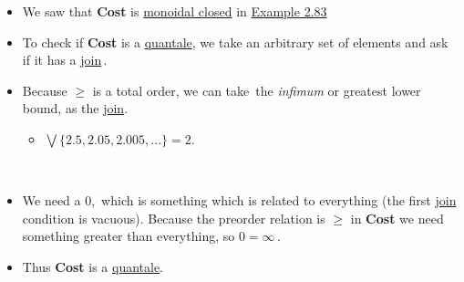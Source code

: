 \begin{itemize}
    \item  We saw that \textbf{Cost} is \href{doc/1 math/Seven Sketches in Compositionality/Chapter 2: Resource theories/5 Computing presented V-categories with matrix mult/1 Monoidal closed preorders/1 Closed SMP}{monoidal closed} in \href{doc/1 math/Seven Sketches in Compositionality/Chapter 2: Resource theories/5 Computing presented V-categories with matrix mult/1 Monoidal closed preorders/3 Cost is closed}{Example 2.83}
    \item To check if \textbf{Cost} is a \href{doc/1 math/Seven Sketches in Compositionality/Chapter 2: Resource theories/5 Computing presented V-categories with matrix mult/2 Quantales/1 Quantale}{quantale}, we take an arbitrary set of elements and ask \,if it has a \href{doc/1 math/Seven Sketches in Compositionality/Chapter 1: Generative Effects/5 Meets and joins/1 Definition and basic examples/Meet and join}{join}\,.
    \item Because $\geq$ is a total order, we can take \,the \emph{infimum} or greatest lower bound, as the \href{doc/1 math/Seven Sketches in Compositionality/Chapter 1: Generative Effects/5 Meets and joins/1 Definition and basic examples/Meet and join}{join}.
          \begin{itemize}
            \item $\bigvee\{2.5,2.05,2.005,...\} = 2$.
          \end{itemize}\,
    \item We need a $0$, \,which is something which is related to everything (the first \href{doc/1 math/Seven Sketches in Compositionality/Chapter 1: Generative Effects/5 Meets and joins/1 Definition and basic examples/Meet and join}{join} condition is vacuous). Because the preorder relation is $\geq$ in \textbf{Cost} we need something greater than everything, so $0 = \infty$\,.
    \item Thus \textbf{Cost} is a \href{doc/1 math/Seven Sketches in Compositionality/Chapter 2: Resource theories/5 Computing presented V-categories with matrix mult/2 Quantales/1 Quantale}{quantale}.
  \end{itemize}